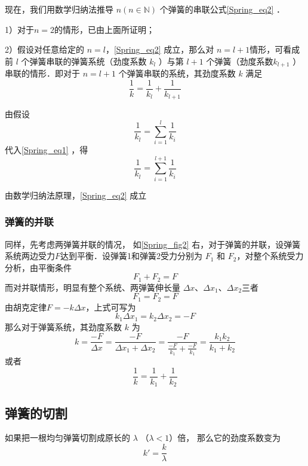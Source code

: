 现在，我们用数学归纳法推导 $n(n\in \mathbb N)$ 个弹簧的串联公式\autoref{Spring_eq2} ．

1）对于$n=2$的情形，已由上面所证明；

2）假设对任意给定的 $n=l$，\autoref{Spring_eq2} 成立，那么对 $n=l+1$情形，可看成前 $l$ 个弹簧串联的弹簧系统（劲度系数 $k_l$ ）与第 $l+1$ 个弹簧（劲度系数$ k_{l+1}$ ）串联的情形．即对于 $n=l+1$ 个弹簧串联的系统，其劲度系数 $k$ 满足
\begin{equation}\label{Spring_eq1}
\frac{1}{k}=\frac{1}{k_l}+\frac{1}{k_{l+1}}
\end{equation}

由假设
\begin{equation}
\frac{1}{k_l}=\sum\limits_{i=1}^{l}\frac{1}{k_i}
\end{equation}
代入\autoref{Spring_eq1} ，得
\begin{equation}
\frac{1}{k_l}=\sum\limits_{i=1}^{l+1}\frac{1}{k_i}
\end{equation}

由数学归纳法原理，\autoref{Spring_eq2} 成立
\subsubsection{弹簧的并联}
同样，先考虑两弹簧并联的情况，
如\autoref{Spring_fig2} 右，对于弹簧的并联，设弹簧系统两边受力$F$达到平衡．设弹簧1和弹簧2受力分别为 $F_1$ 和 $F_2$，对整个系统受力分析，由平衡条件
\begin{equation}
F_1+F_2=F
\end{equation}
而对并联情形，明显有整个系统、两弹簧伸长量 $\Delta x$、$\Delta x_1$、$\Delta x_2$三者
\begin{equation}
F_1=F_2=F
\end{equation}
由胡克定律$F=-k\Delta x$，上式可写为
\begin{equation}
k_1\Delta x_1=k_2\Delta x_2=-F
\end{equation}
那么对于弹簧系统，其劲度系数 $k$ 为
\begin{equation}
k=\frac{-F}{\Delta x}=\frac{-F}{\Delta x_1+\Delta x_2}=\frac{-F}{\frac{-F}{k_1}+\frac{-F}{k_1}}=\frac{k_1k_2}{k_1+k_2}
\end{equation}
或者
\begin{equation}
\frac{1}{k}=\frac{1}{k_1}+\frac{1}{k_2}
\end{equation}

\subsection{弹簧的切割}
如果把一根均匀弹簧切割成原长的 $\lambda$ （$\lambda < 1$）倍， 那么它的劲度系数变为
\begin{equation}\label{Spring_eq4}
k' = \frac{k}{\lambda}
\end{equation}

